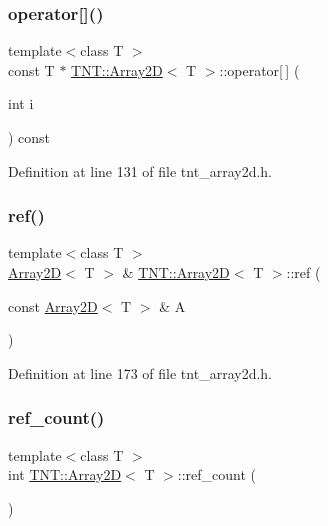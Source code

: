\subsubsection{\texorpdfstring{operator[]()}{operator[]()}\hspace{0.1cm}{\footnotesize\ttfamily [2/2]}}
{\footnotesize\ttfamily template$<$class T $>$ \\
const T $\ast$ \hyperlink{classTNT_1_1Array2D}{T\+N\+T\+::\+Array2D}$<$ T $>$\+::operator\mbox{[}$\,$\mbox{]} (\begin{DoxyParamCaption}\item[{int}]{i }\end{DoxyParamCaption}) const\hspace{0.3cm}{\ttfamily [inline]}}



Definition at line 131 of file tnt\+\_\+array2d.\+h.

\mbox{\label{classTNT_1_1Array2D_a45629cdcb71db56e68c61721ebd6e1cf}} 
\subsubsection{\texorpdfstring{ref()}{ref()}}
{\footnotesize\ttfamily template$<$class T $>$ \\
\hyperlink{classTNT_1_1Array2D}{Array2D}$<$ T $>$ \& \hyperlink{classTNT_1_1Array2D}{T\+N\+T\+::\+Array2D}$<$ T $>$\+::ref (\begin{DoxyParamCaption}\item[{const \hyperlink{classTNT_1_1Array2D}{Array2D}$<$ T $>$ \&}]{A }\end{DoxyParamCaption})\hspace{0.3cm}{\ttfamily [inline]}}



Definition at line 173 of file tnt\+\_\+array2d.\+h.

\mbox{\label{classTNT_1_1Array2D_a1669732a1a744a212c0c23b0cbafb1f1}} 
\subsubsection{\texorpdfstring{ref\+\_\+count()}{ref\_count()}}
{\footnotesize\ttfamily template$<$class T $>$ \\
int \hyperlink{classTNT_1_1Array2D}{T\+N\+T\+::\+Array2D}$<$ T $>$\+::ref\+\_\+count (\begin{DoxyParamCaption}{ }\end{DoxyParamCaption})\hspace{0.3cm}{\ttfamily [inline]}}



